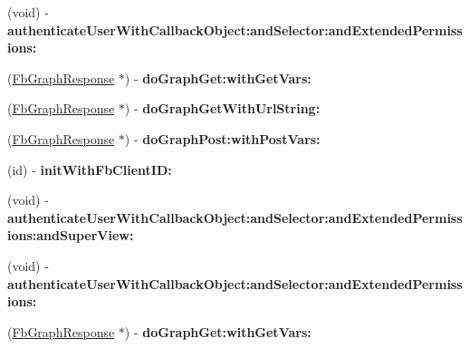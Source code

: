 \begin{DoxyCompactItemize}
\item 
\hypertarget{interface_fb_graph_af67e03ac3dfd34b8cb954cfcf633595a}{
(void) -\/ {\bfseries authenticate\-User\-With\-Callback\-Object\-:and\-Selector\-:and\-Extended\-Permissions\-:}}
\label{interface_fb_graph_af67e03ac3dfd34b8cb954cfcf633595a}

\item 
\hypertarget{interface_fb_graph_aa17e4cf632e883ccce808d0afce0f396}{
(\hyperlink{interface_fb_graph_response}{\-Fb\-Graph\-Response} $\ast$) -\/ {\bfseries do\-Graph\-Get\-:with\-Get\-Vars\-:}}
\label{interface_fb_graph_aa17e4cf632e883ccce808d0afce0f396}

\item 
\hypertarget{interface_fb_graph_ab40685f4804b7cf54eead42829ba406e}{
(\hyperlink{interface_fb_graph_response}{\-Fb\-Graph\-Response} $\ast$) -\/ {\bfseries do\-Graph\-Get\-With\-Url\-String\-:}}
\label{interface_fb_graph_ab40685f4804b7cf54eead42829ba406e}

\item 
\hypertarget{interface_fb_graph_a2a8d5f375485e446458fba832fe03c81}{
(\hyperlink{interface_fb_graph_response}{\-Fb\-Graph\-Response} $\ast$) -\/ {\bfseries do\-Graph\-Post\-:with\-Post\-Vars\-:}}
\label{interface_fb_graph_a2a8d5f375485e446458fba832fe03c81}

\item 
\hypertarget{interface_fb_graph_afd510d4c2b40e9c3057829c3a44d46dc}{
(id) -\/ {\bfseries init\-With\-Fb\-Client\-I\-D\-:}}
\label{interface_fb_graph_afd510d4c2b40e9c3057829c3a44d46dc}

\item 
\hypertarget{interface_fb_graph_a1bc31d022ed142e48addf23d40119a02}{
(void) -\/ {\bfseries authenticate\-User\-With\-Callback\-Object\-:and\-Selector\-:and\-Extended\-Permissions\-:and\-Super\-View\-:}}
\label{interface_fb_graph_a1bc31d022ed142e48addf23d40119a02}

\item 
\hypertarget{interface_fb_graph_af67e03ac3dfd34b8cb954cfcf633595a}{
(void) -\/ {\bfseries authenticate\-User\-With\-Callback\-Object\-:and\-Selector\-:and\-Extended\-Permissions\-:}}
\label{interface_fb_graph_af67e03ac3dfd34b8cb954cfcf633595a}

\item 
\hypertarget{interface_fb_graph_aa17e4cf632e883ccce808d0afce0f396}{
(\hyperlink{interface_fb_graph_response}{\-Fb\-Graph\-Response} $\ast$) -\/ {\bfseries do\-Graph\-Get\-:with\-Get\-Vars\-:}}
\label{interface_fb_graph_aa17e4cf632e883ccce808d0afce0f396}


\end{DoxyCompactItemize}
